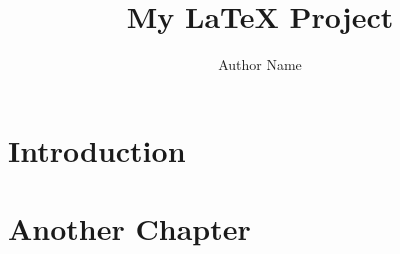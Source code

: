 \documentclass{book}
\begin{document}
\title{My LaTeX Project}
\author{Author Name}
\maketitle

\chapter{Introduction}


\chapter{Another Chapter}

\end{document}
